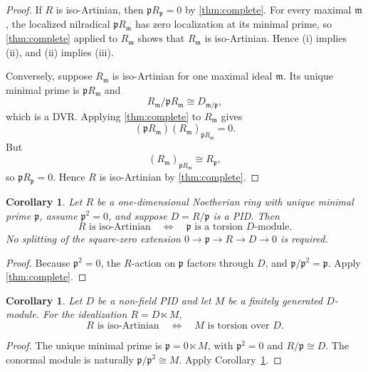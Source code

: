 \documentclass[11pt]{article}
\newtheorem{corollary}[theorem]{Corollary}
\theoremstyle{definition}
\begin{document}
\begin{proof}
If $R$ is iso-Artinian, then $\mathfrak pR_{\mathfrak p}=0$ by \cref{thm:complete}.  For every
maximal $\mathfrak m$, the localized nilradical $\mathfrak pR_{\mathfrak m}$ has zero
localization at its minimal prime, so \cref{thm:complete} applied to $R_{\mathfrak m}$ shows
that $R_{\mathfrak m}$ is iso-Artinian.  Hence (i) implies (ii), and (ii) implies (iii).

Conversely, suppose $R_{\mathfrak m}$ is iso-Artinian for one maximal ideal
$\mathfrak m$.  Its unique minimal prime is $\mathfrak pR_{\mathfrak m}$ and
\[
 R_{\mathfrak m}/\mathfrak pR_{\mathfrak m}
 \cong D_{\mathfrak m/\mathfrak p},
\]
which is a DVR.  Applying \cref{thm:complete} to $R_{\mathfrak m}$ gives
\[
 (\mathfrak pR_{\mathfrak m})
 (R_{\mathfrak m})_{\mathfrak pR_{\mathfrak m}}=0.
\]
But
\[
 (R_{\mathfrak m})_{\mathfrak pR_{\mathfrak m}}\cong R_{\mathfrak p},
\]
so $\mathfrak pR_{\mathfrak p}=0$.  Hence $R$ is iso-Artinian by
\cref{thm:complete}.
\end{proof}





\begin{corollary}\label{cor:square-zero}
Let $R$ be a one-dimensional Noetherian ring with unique minimal prime $\mathfrak p$, assume
$\mathfrak p^2=0$, and suppose $D=R/\mathfrak p$ is a PID.  Then 
\[
 R\text{ is iso-Artinian}
 \quad\Longleftrightarrow\quad
 \mathfrak p\text{ is a torsion }D\text{-module}.
\]
No splitting of the square-zero extension $0\to\mathfrak p\to R\to D\to0$ is required.
\end{corollary}

\begin{proof}
Because $\mathfrak p^2=0$, the $R$-action on $\mathfrak p$ factors through $D$, and
$\mathfrak p/\mathfrak p^2=\mathfrak p$.  Apply \cref{thm:complete}.
\end{proof}

\begin{corollary}\label{cor:idealization}
Let $D$ be a non-field PID and let $M$ be a finitely generated $D$-module.  For the
idealization $R=D\ltimes M$,
\[
 R\text{ is iso-Artinian}
 \quad\Longleftrightarrow\quad
 M\text{ is torsion over }D.
\]
\end{corollary}

\begin{proof}
The unique minimal prime is $\mathfrak p=0\ltimes M$, with $\mathfrak p^2=0$ and
$R/\mathfrak p\cong D$.  The conormal module is naturally
$\mathfrak p/\mathfrak p^2\cong M$.  Apply Corollary~\ref{cor:square-zero}.
\end{proof}
\end{document}
